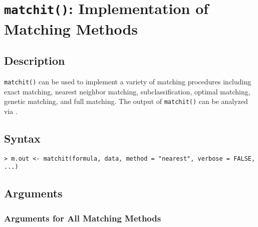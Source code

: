 \section{\texttt{matchit()}: Implementation of Matching Methods}
\label{sec:matchit}

\subsection{Description}

\texttt{matchit()} can be used to implement a variety of matching
procedures including exact matching, nearest neighbor matching,
subclassification, optimal matching, genetic matching, and full
matching. The output of {\tt matchit()} can be analyzed via
.

\subsection{Syntax}
\begin{verbatim}
> m.out <- matchit(formula, data, method = "nearest", verbose = FALSE, ...)
\end{verbatim}

\subsection{Arguments}

\subsubsection{Arguments for All Matching Methods}

